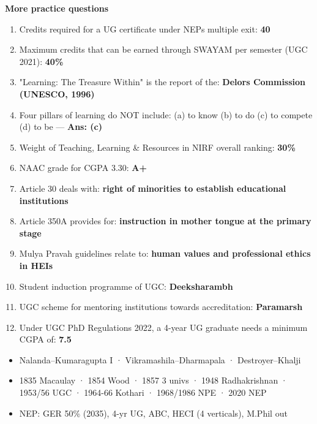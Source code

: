 \textbf{More practice questions}

\begin{enumerate}
\def\labelenumi{\arabic{enumi}.}
\setcounter{enumi}{23}
\tightlist
\item
  Credits required for a UG certificate under NEP\textquotesingle s multiple exit: \textbf{40}
\item
  Maximum credits that can be earned through SWAYAM per semester (UGC 2021): \textbf{40\%}
\item
  "Learning: The Treasure Within" is the report of the: \textbf{Delors Commission (UNESCO, 1996)}
\item
  Four pillars of learning do NOT include: (a) to know (b) to do (c) to compete (d) to be --- \textbf{Ans: (c)}
\item
  Weight of Teaching, Learning \& Resources in NIRF overall ranking: \textbf{30\%}
\item
  NAAC grade for CGPA 3.30: \textbf{A+}
\item
  Article 30 deals with: \textbf{right of minorities to establish educational institutions}
\item
  Article 350A provides for: \textbf{instruction in mother tongue at the primary stage}
\item
  Mulya Pravah guidelines relate to: \textbf{human values and professional ethics in HEIs}
\item
  Student induction programme of UGC: \textbf{Deeksharambh}
\item
  UGC scheme for mentoring institutions towards accreditation: \textbf{Paramarsh}
\item
  Under UGC PhD Regulations 2022, a 4-year UG graduate needs a minimum CGPA of: \textbf{7.5}
\end{enumerate}

\begin{revbox}

\begin{itemize}
\tightlist
\item
  Nalanda--Kumaragupta I · Vikramashila--Dharmapala · Destroyer--Khalji
\item
  1835 Macaulay · 1854 Wood · 1857 3 univs · 1948 Radhakrishnan · 1953/56 UGC · 1964-66 Kothari · 1968/1986 NPE · 2020 NEP
\item
  NEP: GER 50\% (2035), 4-yr UG, ABC, HECI (4 verticals), M.Phil out
\end{itemize}

\end{revbox}
